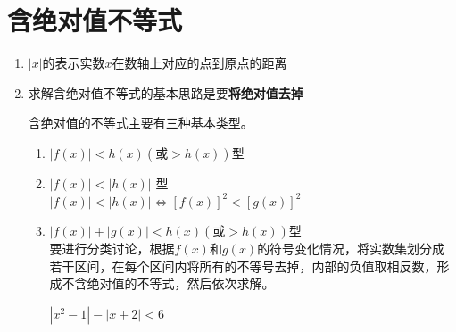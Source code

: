 \section*{含绝对值不等式}
\begin{enumerate}
    \item $|x|$的表示实数$x$在数轴上对应的点到原点的距离
    \item 求解含绝对值不等式的基本思路是要\textbf{将绝对值去掉}
    \begin{example}
    \end{example}
    含绝对值的不等式主要有三种基本类型。
    \begin{enumerate}
        \item $|f(x)| < h(x) (\mbox{或}> h(x))$型
            
        \item $|f(x)| < |h(x)|$ 型 \\
            $|f(x)| < |h(x)| \Longleftrightarrow [f(x)]^2 < [g(x)]^2$
            
        \item $|f(x)| + |g(x)| < h(x) (\mbox{或}> h(x))$型 \\
            要进行分类讨论，根据$f(x)$和$g(x)$的符号变化情况，将实数集划分成若干区间，在每个区间内将所有的不等号去掉，内部的负值取相反数，形成不含绝对值的不等式，然后依次求解。
            \begin{example}
                $|x^2-1| - |x+2| < 6$
                \begin{dingautolist}{172}
                    \item $x \in [1, +\infty)$，不等式化为$(x^2-1)-(x+2) < 6$
                    \item $x \in [-1, 1)$，不等式化为$(1-x^2)-(x+2) < 6$
                    \item $x \in [-2, -1)$，不等式化为$(x^2-1)-(x+2) < 6$
                    \item $x \in (-\infty, -2)$，不等式化为$(x^2-1)-(-x-2) < 6$
                \end{dingautolist}
            \end{example}
    \end{enumerate}
\end{enumerate}
